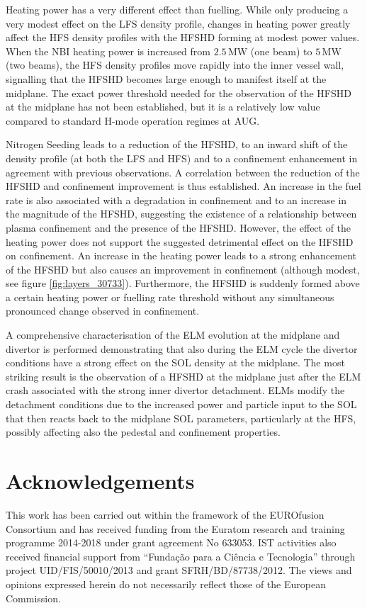 \documentclass[12pt]{iopart}
\begin{document}
Heating power has a very different effect than fuelling. While only producing a very modest effect on the LFS density profile, changes in heating power greatly affect the HFS density profiles with the HFSHD forming at modest power values. When the NBI heating power is increased from $\mathrm{2.5\,MW}$ (one beam) to $\mathrm{5\,MW}$ (two beams), the HFS density profiles move rapidly into the inner vessel wall, signalling that the HFSHD becomes large enough to manifest itself at the midplane. The exact power threshold needed for the observation of the HFSHD at the midplane has not been established, but it is a relatively low value compared to standard H-mode operation regimes at AUG.

Nitrogen Seeding leads to a reduction of the HFSHD, to an inward shift of the density profile (at both the LFS and HFS) and to a confinement enhancement in agreement with previous observations. A correlation between the reduction of the HFSHD and confinement improvement \cite{Potzel2015,Dunne2017} is thus established. An increase in the fuel rate is also associated with a degradation in confinement and to an increase in the magnitude of the HFSHD, suggesting the existence of a relationship between plasma confinement and the presence of the HFSHD. However, the effect of the heating power does not support the suggested detrimental effect on the HFSHD on confinement. An increase in the heating power leads to a strong enhancement of the HFSHD but also causes an improvement in confinement (although modest, see figure \ref{fig:layers_30733}). Furthermore, the HFSHD is suddenly formed above a certain heating power or fuelling rate threshold without any simultaneous pronounced change observed in confinement.

A comprehensive characterisation of the ELM evolution at the midplane and divertor is performed demonstrating that also during the ELM cycle the divertor conditions have a strong effect on the SOL density at the midplane. The most striking result is the observation of a HFSHD at the midplane just after the ELM crash associated with the strong inner divertor detachment. ELMs modify the detachment conditions due to the increased power and particle input to the SOL that then reacts back to the midplane SOL parameters, particularly at the HFS, possibly affecting also the pedestal and confinement properties. 

\section{Acknowledgements}
This work has been carried out within the framework of the EUROfusion Consortium and has received funding from the Euratom research and training programme 2014-2018 under grant agreement No 633053. IST activities also received financial support from “Funda\c{c}\~ao para a Ci\^encia e Tecnologia” through project UID/FIS/50010/2013 and grant SFRH/BD/87738/2012. The views and opinions expressed herein do not necessarily reflect those of the European Commission.



\end{document}
